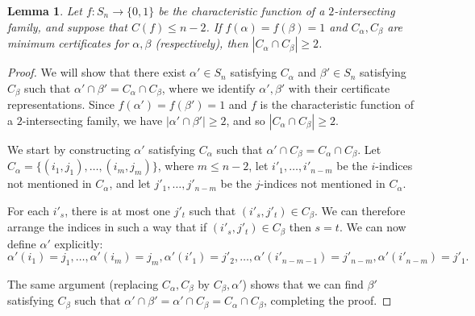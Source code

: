 \documentclass[10pt,a4paper]{article}
\newtheorem{lemma}[theorem]{Lemma}
\theoremstyle{definition}
\begin{document}
\begin{lemma} \label{lem:2-int-coset-sym}
Let $f\colon S_n \to \{0,1\}$ be the characteristic function of a $2$-intersecting family, and suppose that $C(f) \leq n-2$. If $f(\alpha) = f(\beta) = 1$ and $C_\alpha,C_\beta$ are minimum certificates for $\alpha,\beta$ (respectively), then $|C_\alpha \cap C_\beta| \geq 2$.
\end{lemma}

\begin{proof}
We will show that there exist $\alpha' \in S_n$ satisfying $C_\alpha$ and $\beta' \in S_n$ satisfying $C_\beta$ such that $\alpha' \cap \beta' = C_\alpha \cap C_\beta$, where we identify $\alpha',\beta'$ with their certificate representations. Since $f(\alpha') = f(\beta') = 1$ and $f$ is the characteristic function of a $2$-intersecting family, we have $|\alpha' \cap \beta'| \geq 2$, and so $|C_\alpha \cap C_\beta| \geq 2$.

We start by constructing $\alpha'$ satisfying $C_\alpha$ such that $\alpha' \cap C_\beta = C_\alpha \cap C_\beta$. Let $C_\alpha = \{(i_1,j_1),\ldots,(i_m,j_m)\}$, where $m \leq n-2$, let $i'_1,\ldots,i'_{n-m}$ be the $i$-indices not mentioned in $C_\alpha$, and let $j'_1,\ldots,j'_{n-m}$ be the $j$-indices not mentioned in $C_\alpha$.

For each $i'_s$, there is at most one $j'_t$ such that $(i'_s,j'_t) \in C_\beta$. We can therefore arrange the indices in such a way that if $(i'_s,j'_t) \in C_\beta$ then $s = t$. We can now define $\alpha'$ explicitly:
\[
 \alpha'(i_1) = j_1, \ldots, \alpha'(i_m) = j_m,
 \alpha'(i'_1) = j'_2, \ldots, \alpha'(i'_{n-m-1}) = j'_{n-m}, \alpha'(i'_{n-m}) = j'_1.
\]

The same argument (replacing $C_\alpha,C_\beta$ by $C_\beta,\alpha'$) shows that we can find $\beta'$ satisfying $C_\beta$ such that $\alpha' \cap \beta' = \alpha' \cap C_\beta = C_\alpha \cap C_\beta$, completing the proof.
\end{proof}
\end{document}
